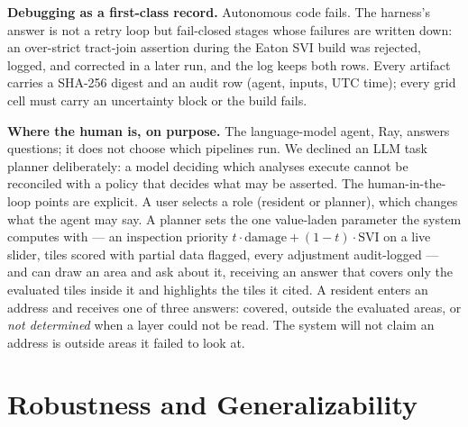\documentclass[sigconf,screen]{acmart}
\begin{document}
\textbf{Debugging as a first-class record.} Autonomous code fails. The
harness's answer is not a retry loop but fail-closed stages whose
failures are written down: an over-strict tract-join assertion during the
Eaton SVI build was rejected, logged, and corrected in a later run, and
the log keeps both rows. Every artifact carries a SHA-256 digest and an
audit row (agent, inputs, UTC time); every grid cell must carry an
uncertainty block or the build fails.

\textbf{Where the human is, on purpose.} The language-model agent, Ray,
answers questions; it does not choose which pipelines run. We declined an
LLM task planner deliberately: a model deciding which analyses execute
cannot be reconciled with a policy that decides what may be asserted. The
human-in-the-loop points are explicit. A user selects a role (resident or
planner), which changes what the agent may say. A planner sets the one
value-laden parameter the system computes with --- an inspection priority
$t\cdot\mathrm{damage} + (1-t)\cdot\mathrm{SVI}$ on a live slider, tiles
scored with partial data flagged, every adjustment audit-logged --- and can
draw an area and ask about it, receiving an answer that covers only the
evaluated tiles inside it and highlights the tiles it cited. A resident
enters an address and receives one of three answers: covered, outside the
evaluated areas, or \emph{not determined} when a layer could not be read.
The system will not claim an address is outside areas it failed to look
at.

\section{Robustness and Generalizability}
\label{sec:robust}
\end{document}
